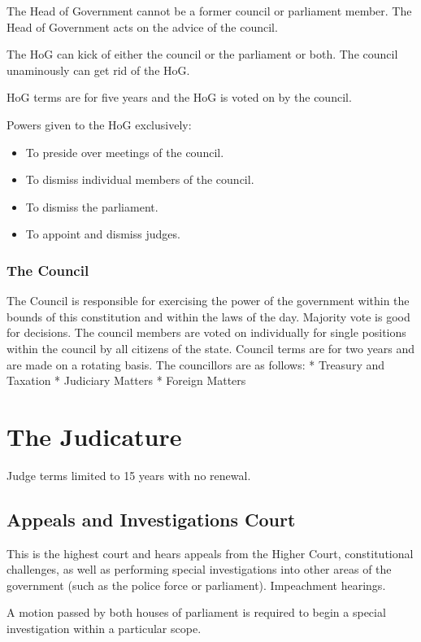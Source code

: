 \documentclass[a4paper]{report}
\begin{document}
The Head of Government cannot be a former council or parliament member. The Head of Government acts on the advice of the council. 

The HoG can kick of either the council or the parliament or both. The council unaminously can get rid of the HoG. 

HoG terms are for five years and the HoG is voted on by the council. 

Powers given to the HoG exclusively:

\begin{itemize}
	\item To preside over meetings of the council.
	\item To dismiss individual members of the council.
	\item To dismiss the parliament.
	\item To appoint and dismiss judges.
\end{itemize}

\subsection{The Council}
The Council is responsible for exercising the power of the government within the bounds of this constitution and within the laws of the day. Majority vote is good for decisions. The council members are voted on individually for single positions within the council by all citizens of the state. Council terms are for two years and are made on a rotating basis. The councillors are as follows:
* Treasury and Taxation
* Judiciary Matters
* Foreign Matters

\chapter{The Judicature}

Judge terms limited to 15 years with no renewal.

\section{Appeals and Investigations Court}

This is the highest court and hears appeals from the Higher Court, constitutional challenges, as well as performing special investigations into other areas of the government (such as the police force or parliament). Impeachment hearings.

A motion passed by both houses of parliament is required to begin a special investigation within a particular scope.
\end{document}
